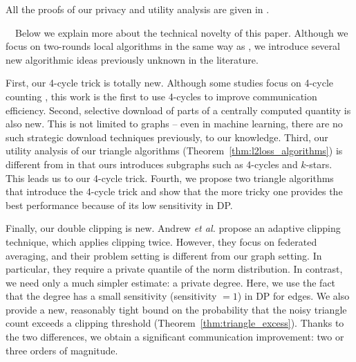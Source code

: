 All the proofs of our privacy and utility analysis 
are given in .

\smallskip
{}~~Below we explain more about 
the technical novelty of this paper. 
Although we focus on two-rounds local algorithms in the same way as \cite{Imola_USENIX21}, we introduce several new algorithmic ideas previously unknown in the literature. 

First, our 4-cycle trick is totally new. 
Although some studies focus on 4-cycle counting \cite{Bera_STACS17,Kallaugher_PODS19,Manjunath_ESA11,McGregor_PODS20}, this work is the first to use 4-cycles to improve communication efficiency. 
Second, selective download of parts of a centrally computed quantity is also new. 
This is not limited to graphs -- even in machine learning, 
there are no such strategic download techniques previously, to our knowledge. 
Third, our utility analysis of our 
triangle 
algorithms (Theorem~\ref{thm:l2loss_algorithms}) is 
different from \cite{Imola_USENIX21} in that ours introduces subgraphs such as 4-cycles and $k$-stars. 
This leads us to our 4-cycle trick. 
Fourth, we propose two triangle algorithms that introduce the 4-cycle trick and show that the more tricky one provides the best performance because of 
its low sensitivity in DP.

Finally, 
our double clipping is new. 
Andrew \textit{et al.} \cite{Andrew_NeurIPS21} propose an adaptive clipping technique, which applies clipping twice. 
However, they focus on federated averaging, 
and their problem setting is different from our graph setting. 
In particular, they require a private quantile of the norm distribution. 
In contrast, we need only a much simpler estimate: a private degree. 
Here, we use the fact that the degree has a small sensitivity (sensitivity $=1$) in DP for edges. 
We also provide a new, reasonably tight bound on the probability that the noisy triangle count exceeds a clipping threshold (Theorem~\ref{thm:triangle_excess}). 
Thanks to the two differences, we obtain a significant communication improvement: two or three orders of magnitude. 

